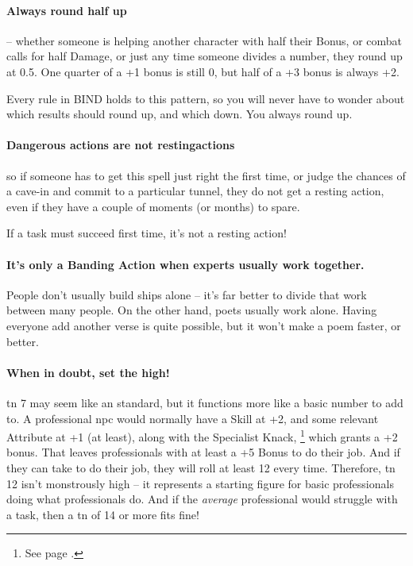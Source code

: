 \begin{multicols}{2}
\begin{scriptsize}
\begin{boxtable}[clXX]
\end{boxtable}
\end{scriptsize}

\paragraph{Always round half up} -- whether someone is helping another character with half their Bonus, or combat calls for half Damage, or just any time someone divides a number, they round up at 0.5.
One quarter of a +1 bonus is still 0, but half of a +3 bonus is always +2.

Every rule in BIND holds to this pattern, so you will never have to wonder about which results should round up, and which down.
You always round up.

\paragraph{Dangerous actions are not \glspl{restingaction}}
so if someone has to get this spell just right the first time, or judge the chances of a cave-in and commit to a particular tunnel, they do not get a resting action, even if they have a couple of moments (or months) to spare.

If a task must succeed first time, it's not a resting action!

\paragraph{It's only a Banding Action when experts usually work together.}
People don't usually build ships alone -- it's far better to divide that work between many people.
On the other hand, poets usually work alone.
Having everyone add another verse is quite possible, but it won't make a poem faster, or better.

\paragraph{When in doubt, set the  high!}
\Gls{tn} 7 may seem like an standard, but it functions more like a basic number to add to.
A professional \gls{npc} would normally have a Skill at +2, and some relevant Attribute at +1 (at least), along with the Specialist Knack,%
\footnote{See page \pageref{specialist}.}
which grants a +2 bonus.
That leaves professionals with at least a +5 Bonus to do their job.
And if they can take  to do their job, they will roll at least 12 every time.
Therefore, \gls{tn} 12 isn't monstrously high -- it represents a starting figure for basic professionals doing what professionals do.
And if the \emph{average} professional would struggle with a task, then a \gls{tn} of 14 or more fits fine!


\end{multicols}
